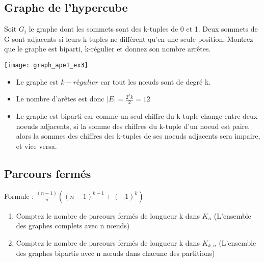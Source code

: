 \subsection{Graphe de l'hypercube}
Soit $G_{i}$ le graphe dont les sommets sont des k-tuples de 0 et 1. Deux sommets de G sont adjacents si leurs k-tuples ne diffèrent qu'en une seule position. Montrez que le graphe est biparti, k-régulier et donnez son nombre arrêtes.\\

\begin{solution}
\begin{minipage}{0.35\textwidth}
\begin{flushleft}
\texttt{[image: graph\_ape1\_ex3]}
\end{flushleft}
\end{minipage}
\begin{minipage}{0.65\textwidth}
\begin{flushright}
\begin{itemize}
\item Le graphe est $k-régulier$ car tout les nœuds sont de degré k.
\item Le nombre d'arêtes est donc $|E| = \frac{2^{k} k}{2} = 12$
\item Le graphe est biparti car comme un seul chiffre du k-tuple change entre deux noeuds adjacents, si la somme des chiffres du k-tuple d'un noeud est paire, alors la sommes des chiffres des k-tuples de ses noeuds adjacents sera impaire, et vice versa.
\end{itemize}
\end{flushright}
\end{minipage}
\end{solution}

\subsection{Parcours fermés}
Formule : $\frac{(n-1)}{n}((n-1)^{k-1}+(-1)^{k})$
\begin{enumerate}
\item{Comptez le nombre de parcours fermés de longueur k dans $K_{n}$ (L'ensemble des graphes complets avec n nœuds)}
\item{Comptez le nombre de parcours fermés de longueur k dans $K_{k,n}$ (L'ensemble des graphes bipartis avec n nœuds dans chacune des partitions)}
\end{enumerate}

